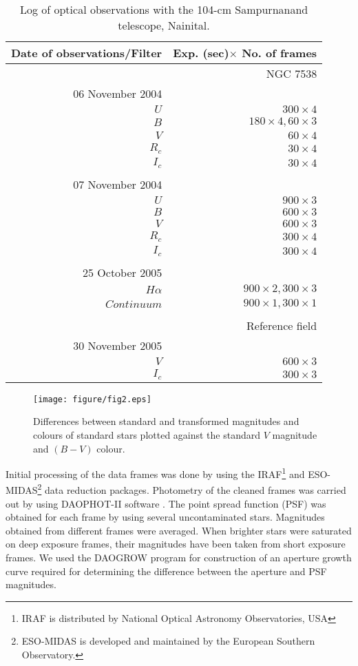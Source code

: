 \documentclass[a4paper,fleqn,usenatbib,useAMS]{mnras}
\begin{document}
\begin{table}
\caption{\label{log}  Log of optical observations with the 104-cm Sampurnanand telescope, Nainital.}
\begin{tabular}{@{}rr@{}}
\hline
Date of observations/Filter& Exp. (sec)$\times$ No. of frames\\
\hline
&NGC 7538\\
06 November 2004\\
$U$   &  $300\times4$\\
$B$   &  $180\times4,60\times3$\\
$V$   &  $60\times4$\\
$R_c$ &  $30\times4$\\
$I_c$ &  $30\times4$\\
\\
07 November 2004\\
$U$   &  $900\times3$\\
$B$   &  $600\times3$\\
$V$   &  $600\times3$\\
$R_c$ &  $300\times4$\\
$I_c$ &  $300\times4$\\
\\
25 October 2005\\
$H\alpha$ &$900\times2,300\times3$\\
$Continuum$&$900\times1,300\times1$\\
\\
&Reference field\\
30 November 2005\\
$V$   &  $600\times3$\\
$I_c$   &  $300\times3$\\
\hline
\end{tabular}
\end{table}

\begin{figure}
\centering
\texttt{[image: figure/fig2.eps]}
\caption{\label{resd} Differences between standard and transformed magnitudes 
and colours of standard
stars plotted against the standard $V$ magnitude and $(B-V)$ colour.}
\end{figure}


Initial processing of the data frames was done by 
using the IRAF\footnote{IRAF is distributed by National Optical Astronomy
Observatories, USA} and ESO-MIDAS\footnote{ ESO-MIDAS is developed and
maintained by the  European Southern Observatory.} data reduction packages. Photometry  of
the cleaned frames was carried out by using DAOPHOT-II software \citep{1987PASP...99..191S}.
The point spread function (PSF) was obtained for each frame by using several uncontaminated
stars. Magnitudes obtained from different frames
were averaged. When brighter stars were saturated on deep exposure frames, their
magnitudes have been taken from short exposure frames.
We used the DAOGROW program for construction of an aperture growth curve required for
determining the difference between the aperture and PSF magnitudes.
\end{document}
